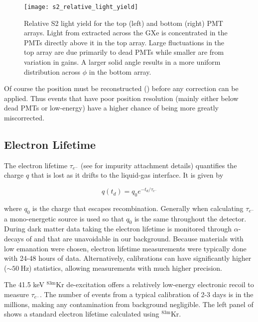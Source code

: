 \begin{figure}
\centering
\texttt{[image: s2\_relative\_light\_yield]}
\caption{Relative S2 light yield for the top (left) and bottom (right) PMT arrays.  Light from \electron extracted across the GXe is
concentrated in the PMTs directly above it in the top array.  Large fluctuations in the top array are due primarily to dead PMTs while
smaller are from variation in gains.  A larger solid angle results in a more uniform distribution across $\phi$ in the bottom array.}
\label{fig:calibrations_s2_maps}
\end{figure}

Of course the position must be reconstructed () before any correction can be
applied.  Thus events that have poor position resolution (mainly either below dead PMTs or low-energy) have a higher chance of being
more greatly miscorrected.



\subsection{Electron Lifetime}
\label{subsec:det_char_elifetime}
The electron lifetime $\tau_{e^-}$ (see  for impurity attachment details) quantifies the charge $q$
that is lost as it drifts to the liquid-gas interface.  It is given by

\begin{equation}
q(t_d) = q_0 e^{-t_d / \tau_{e^-}}
\label{eq:det_char_elifetime}
\end{equation}

\noindent where $q_0$ is the charge that escapes recombination.  Generally when calculating $\tau_{e^-}$ a mono-energetic source is used so
that $q_0$ is the same throughout the detector.  During dark matter data taking the electron lifetime is monitored through
$\alpha$-decays of  and  that are unavoidable in our background.  Because materials with low 
emanation were chosen, electron lifetime measurements were typically done with 24-48 hours of data.  Alternatively, calibrations can
have significantly higher (${\sim}50\ \mathrm{Hz}$) statistics, allowing measurements with much higher precision.

The 41.5 keV $\mathrm{^{83m}Kr}$ de-excitation offers a relatively low-energy electronic recoil to measure $\tau_{e^-}$.  The number of events
from a typical calibration of 2-3 days is in the millions, making any contamination from background negligible.  The left panel of
 shows a standard electron lifetime calculated using $\mathrm{^{83m}Kr}$.


